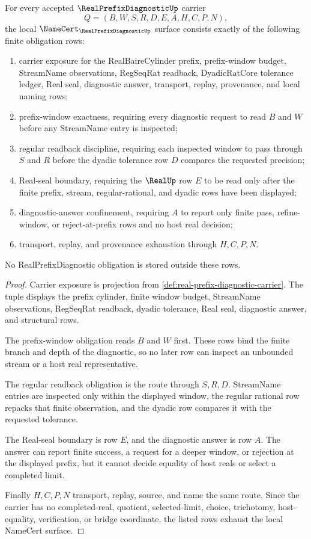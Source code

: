 \begin{theorem}
\label{thm:real-prefix-diagnostic-namecert-obligations}
For every accepted $\RealPrefixDiagnosticUp$ carrier
$$
Q=(B,W,S,R,D,E,A,H,C,P,N),
$$
the local $\NameCert_{\RealPrefixDiagnosticUp}$ surface consists exactly of the following finite obligation rows:
\begin{enumerate}
\item carrier exposure for the RealBaireCylinder prefix, prefix-window budget, StreamName observations, RegSeqRat readback, DyadicRatCore tolerance ledger, Real seal, diagnostic answer, transport, replay, provenance, and local naming rows;
\item prefix-window exactness, requiring every diagnostic request to read $B$ and $W$ before any StreamName entry is inspected;
\item regular readback discipline, requiring each inspected window to pass through $S$ and $R$ before the dyadic tolerance row $D$ compares the requested precision;
\item Real-seal boundary, requiring the $\RealUp$ row $E$ to be read only after the finite prefix, stream, regular-rational, and dyadic rows have been displayed;
\item diagnostic-answer confinement, requiring $A$ to report only finite pass, refine-window, or reject-at-prefix rows and no host real decision;
\item transport, replay, and provenance exhaustion through $H,C,P,N$.
\end{enumerate}
No RealPrefixDiagnostic obligation is stored outside these rows.
\end{theorem}
\begin{proof}
Carrier exposure is projection from \autoref{def:real-prefix-diagnostic-carrier}. The tuple displays the prefix cylinder, finite window budget, StreamName observations, RegSeqRat readback, dyadic tolerance, Real seal, diagnostic answer, and structural rows.

The prefix-window obligation reads $B$ and $W$ first. These rows bind the finite branch and depth of the diagnostic, so no later row can inspect an unbounded stream or a host real representative.

The regular readback obligation is the route through $S,R,D$. StreamName entries are inspected only within the displayed window, the regular rational row repacks that finite observation, and the dyadic row compares it with the requested tolerance.

The Real-seal boundary is row $E$, and the diagnostic answer is row $A$. The answer can report finite success, a request for a deeper window, or rejection at the displayed prefix, but it cannot decide equality of host reals or select a completed limit.

Finally $H,C,P,N$ transport, replay, source, and name the same route. Since the carrier has no completed-real, quotient, selected-limit, choice, trichotomy, host-equality, verification, or bridge coordinate, the listed rows exhaust the local NameCert surface.
\end{proof}

